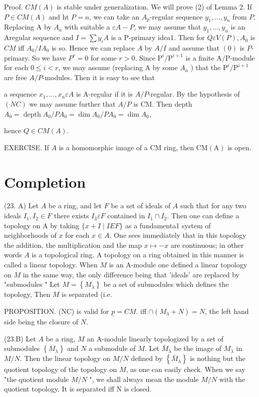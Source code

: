 Proof. $C M(A)$ is stable under generalization. We will prove (2) of Lemma 2. If $P \in C M(A)$ and ht $P=n$, we can take an $A_{p}$-regular sequence $y_{1}, \ldots, y_{n}$ from $P$. Replacing A by $A_{a}$ with suitable a $\varepsilon A-P$, we may assume that $y_{1}, \ldots, y_{n}$ is an Aregular sequence and $I=\sum y_{i} A$ is a P-primary idea1. Then for $Q \varepsilon V(P), A_{0}$ is $C M$ iff $A_{0} / I A_{0}$ is so. Hence we can replace $A$ by $A / I$ and assume that $(0)$ is $P$-primary. So we have $P^{r}=0$ for some $r>0$. Since $\mathrm{P}^{i} / \mathrm{P}^{i+1}$ is a finite $\mathrm{A} / \mathrm{P}$-module for each $0 \leq i<r$, we may assume (replacing A by some $A_{a}$ ) that the $\mathrm{P}^{i} / \mathrm{P}^{i+1}$ are free $A / P$-modules. Then it is easy to see that

a sequence $x_{1}, \ldots, x_{n} \varepsilon A$ is A-regular if it is $A / P$-regular. By the hypothesis of $(N C)$ we may assume further that $A / P$ is CM. Then depth $A_{0}=\operatorname{depth} A_{0} / P A_{0}=\operatorname{dim} A_{0} / P A_{0}=\operatorname{dim} A_{0}$,

hence $Q \in C M(A)$.

EXERCISE. If $A$ is a homomorphic image of a CM ring, then $\mathrm{CM}(\mathrm{A})$ is open.

\section{Completion}
(23. A) Let $A$ be a ring, and let $F$ be a set of ideals of $A$ such that for any two ideals $I_{1}, I_{2} \in F$ there exists $I_{3} \varepsilon F$ contained in $I_{1} \cap I_{2}$. Then one can define a topology on A by taking $\{x+I \mid I E F\}$ as a fundamenta1 system of neighborhoods of $x$ for each $x \in A$. One sees immediately that in this topology the addition, the multiplication and the map $x \mapsto-x$ are continuous; in other words $A$ is a topological ring. A topology on a ring obtained in this manner is called a linear topology. When $M$ is an A-module one defined a linear topology on $M$ in the same way, the only difference being that 'ideals' are replaced by "submodules " Let $M=\left\{M_{\lambda}\right\}$ be a set of submodules which defines the topology, Then $M$ is separated (i.e.

PROPOSITION. (NC) is valid for $\underline{p}=C M$. iff $\cap\left(M_{\lambda}+N\right)=N$, the left hand side being the closure of $N$.

(23.B) Let $A$ be a ring, $M$ an A-module linearly topologized by a set of submodules $\left\{M_{\lambda}\right\}$ and $N$ a submodule of $M$. Let $\bar{M}_{\lambda}$ be the image of $M_{\lambda}$ in $M / N$. Then the linear topology on $M / N$ defined by $\left\{\bar{M}_{\lambda}\right\}$ is nothing but the quotient topology of the topology on $M$, as one can easily check. When we say "the quotient module $M / N$ ", we shall always mean the module $M / N$ with the quotient topology. It is separated iff $\mathrm{N}$ is closed.

